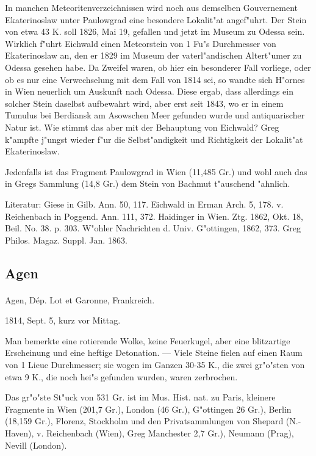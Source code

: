 \documentclass[a4paper, 11pt, oneside]{article}
\begin{document}
In manchen Meteoritenverzeichnissen wird noch aus demselben Gouvernement Ekaterinoslaw unter Paulowgrad eine besondere Lokalit"at angef"uhrt. Der Stein von etwa 43 K. soll 1826, Mai 19, gefallen und jetzt im Museum zu Odessa sein. Wirklich f"uhrt Eichwald einen Meteorstein von 1 Fu"s Durchmesser von Ekaterinoslaw an, den er 1829 im Museum der vaterl"andischen Altert"umer zu Odessa gesehen habe. Da Zweifel waren, ob hier ein besonderer Fall vorliege, oder ob es nur eine Verwechselung mit dem Fall von 1814 sei, so wandte sich H"ornes in Wien neuerlich um Auskunft nach Odessa. Diese ergab, dass allerdings ein solcher Stein daselbst aufbewahrt wird, aber erst seit 1843, wo er in einem Tumulus bei Berdiansk am Asowschen Meer gefunden wurde und antiquarischer Natur ist. Wie stimmt das aber mit der Behauptung von Eichwald? Greg k"ampfte j"ungst wieder f"ur die Selbst"andigkeit und Richtigkeit der Lokalit"at Ekaterinoslaw.

Jedenfalls ist das Fragment Paulowgrad in Wien (11,485 Gr.) und wohl auch das in Gregs Sammlung (14,8 Gr.) dem Stein von Bachmut t"auschend "ahnlich.

Literatur: Giese in Gilb. Ann. 50, 117. Eichwald in Erman Arch. 5, 178. v. Reichenbach in Poggend. Ann. 111, 372. Haidinger in Wien. Ztg. 1862, Okt. 18, Beil. No. 38. p. 303. W"ohler Nachrichten d. Univ. G"ottingen, 1862, 373. Greg Philos. Magaz. Suppl. Jan. 1863.

\subsection{Agen}
\normalsize
\paragraph{}
Agen, Dép. Lot et Garonne, Frankreich.

1814, Sept. 5, kurz vor Mittag.

Man bemerkte eine rotierende Wolke, keine Feuerkugel, aber eine blitzartige Erscheinung und eine heftige Detonation. --- Viele Steine fielen auf einen Raum von 1 Lieue Durchmesser; sie wogen im Ganzen 30-35 K., die zwei gr"o"sten von etwa 9 K., die noch hei"s gefunden wurden, waren zerbrochen.

Das gr"o"ste St"uck von 531 Gr. ist im Mus. Hist. nat. zu Paris, kleinere Fragmente in Wien (201,7 Gr.), London (46 Gr.), G"ottingen 26 Gr.), Berlin (18,159 Gr.), Florenz, Stockholm und den Privatsammlungen von Shepard (N.-Haven), v. Reichenbach (Wien), Greg Manchester 2,7 Gr.), Neumann (Prag), Nevill (London).
\end{document}
